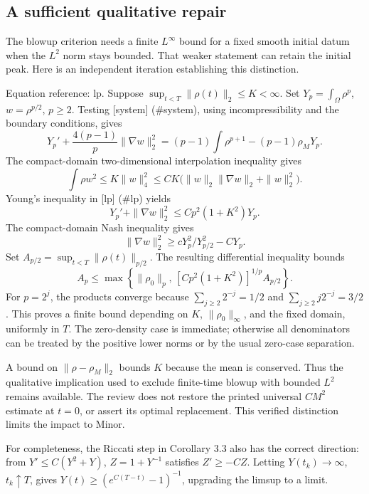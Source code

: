 \documentclass[10pt]{article}
\begin{document}
\subsection*{A sufficient qualitative repair}
The blowup criterion needs a finite \(L^\infty\) bound for a fixed smooth initial datum when the \(L^2\) norm stays bounded. That weaker statement can retain the initial peak. Here is an independent iteration establishing this distinction.\par
Equation reference: lp. Suppose \(\sup_{t<T}\|\rho(t)\|_2\le K<\infty\). Set \(Y_p=\int_\Omega\rho^p\), \(w=\rho^{p/2}\), \(p\ge2\). Testing [system] (\#system), using incompressibility and the boundary conditions, gives \[
 Y_p'+\frac{4(p-1)}p\|\nabla w\|_2^2
 =(p-1)\int\rho^{p+1}-(p-1)\rho_MY_p.\] The compact-domain two-dimensional interpolation inequality gives \[\int\rho w^2\le K\|w\|_4^2
 \le CK\bigl(\|w\|_2\|\nabla w\|_2+\|w\|_2^2\bigr).\] Young’s inequality in [lp] (\#lp) yields \[Y_p'+\|\nabla w\|_2^2\le Cp^2(1+K^2)Y_p.\] The compact-domain Nash inequality gives \[\|\nabla w\|_2^2\ge cY_p^2/Y_{p/2}^2-CY_p.\] Set \(A_{p/2}=\sup_{t<T}\|\rho(t)\|_{p/2}\). The resulting differential inequality bounds \[A_p\le
 \max\left\{\|\rho_0\|_p,\,
 [Cp^2(1+K^2)]^{1/p}A_{p/2}\right\}.\] For \(p=2^j\), the products converge because \(\sum_{j\ge2}2^{-j}=1/2\) and \(\sum_{j\ge2}j2^{-j}=3/2\). This proves a finite bound depending on \(K\), \(\|\rho_0\|_\infty\), and the fixed domain, uniformly in \(T\). The zero-density case is immediate; otherwise all denominators can be treated by the positive lower norms or by the usual zero-case separation.\par
A bound on \(\|\rho-\rho_M\|_2\) bounds \(K\) because the mean is conserved. Thus the qualitative implication used to exclude finite-time blowup with bounded \(L^2\) remains available. The review does not restore the printed universal \(CM^2\) estimate at \(t=0\), or assert its optimal replacement. This verified distinction limits the impact to Minor.\par
For completeness, the Riccati step in Corollary 3.3 also has the correct direction: from \(Y'\le C(Y^2+Y)\), \(Z=1+Y^{-1}\) satisfies \(Z'\ge-CZ\). Letting \(Y(t_k)\to\infty\), \(t_k\uparrow T\), gives \(Y(t)\ge(e^{C(T-t)}-1)^{-1}\), upgrading the limsup to a limit.\par
\end{document}
